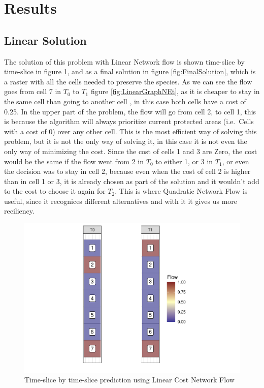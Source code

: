 \documentclass[]{article}
\begin{document}
\hypertarget{results}{%
\section{Results}\label{results}}

\hypertarget{linear-solution}{%
\subsection{Linear Solution}\label{linear-solution}}

The solution of this problem with Linear Network flow is shown time-slice by time-slice in figure \ref{fig:FinalStack}, and as a final solution in figure \ref{fig:FinalSolution}, which is a raster with all the cells needed to preserve the species. As we can see the flow goes from cell 7 in \(T_0\) to \(T_1\) figure \ref{fig:LinearGraphNEt}, as it is cheaper to stay in the same cell than going to another cell , in this case both cells have a cost of 0.25. In the upper part of the problem, the flow will go from cell 2, to cell 1, this is because the algorithm will always prioritize current protected areas (i.e.~Cells with a cost of 0) over any other cell. This is the most efficient way of solving this problem, but it is not the only way of solving it, in this case it is not even the only way of minimizing the cost. Since the cost of cells 1 and 3 are Zero, the cost would be the same if the flow went from 2 in \(T_0\) to either 1, or 3 in \(T_1\), or even the decision was to stay in cell 2, because even when the cost of cell 2 is higher than in cell 1 or 3, it is already chosen as part of the solution and it wouldn't add to the cost to choose it again for \(T_2\). This is where Quadratic Network Flow is useful, since it recognices different alternatives and with it it gives us more reciliency.

\begin{figure}
\centering
\includegraphics{TagetBasedNew_files/figure-latex/FinalStack-1.pdf}
\caption{\label{fig:FinalStack}Time-slice by time-slice prediction using Linear Cost Network Flow}
\end{figure}
\end{document}
